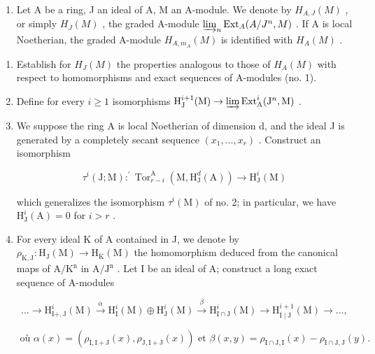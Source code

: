 
\begin{enumerate}
\def\labelenumi{\arabic{enumi})}
\tightlist
\item
  Let A be a ring, J an ideal of A, M an A-module. We denote by \(H_{A,J}(M)\) , or simply \(H_{J}(M)\) , the graded A-module \(\varinjlim_{n}\operatorname{Ext}_{A}(A/J^{n},M)\) . If A is local Noetherian, the graded A-module \(H_{A,m_{A}}(M)\) is identified with \(H_{A}(M)\) .
\end{enumerate}

\begin{enumerate}
\def\labelenumi{\alph{enumi})}
\item
  Establish for \(H_{J}(M)\) the properties analogous to those of \(H_{A}(M)\) with respect to homomorphisms and exact sequences of A-modules (no. 1).
\item
  Define for every \(i \geqslant 1\) isomorphisms \(\mathrm{H}_{\mathrm{J}}^{i+1}(\mathrm{M}) \to \varinjlim \operatorname{Ext}_{\mathrm{A}}^{i}(\mathrm{J}^{n}, \mathrm{M})\) .
\item
  We suppose the ring A is local Noetherian of dimension d, and the ideal J is generated by a completely secant sequence \((x_{1},\ldots,x_{r})\) . Construct an isomorphism

\[
\tau^ {i} (\mathrm{J}; \mathrm{M}): ^ {\prime} \operatorname{Tor} _ {r - i} ^ {\mathrm{A}} (\mathrm{M}, \mathrm{H} _ {\mathrm{J}} ^ {d} (\mathrm{A})) \longrightarrow \mathrm{H} _ {\mathrm{J}} ^ {i} (\mathrm{M})
\]

which generalizes the isomorphism \(\tau^{i}(\mathrm{M})\) of no. 2; in particular, we have \(\mathrm{H}_{\mathrm{J}}^{i}(\mathrm{A}) = 0\) for \(i > r\) .

\item
  For every ideal K of A contained in J, we denote by \(\rho_{\mathrm{K},\mathrm{J}}:\mathrm{H}_{\mathrm{J}}(\mathrm{M})\to \mathrm{H}_{\mathrm{K}}(\mathrm{M})\) the homomorphism deduced from the canonical maps of \(\mathrm{A / K^n}\) in \(\mathrm{A / J^n}\) . Let I be an ideal of A; construct a long exact sequence of A-modules

\[
\dots \longrightarrow \mathrm{H} _ {\mathrm{I} +, \mathrm{J}} ^ {i} (\mathrm{M}) \stackrel {\alpha} {\longrightarrow} \mathrm{H} _ {\mathrm{I}} ^ {i} (\mathrm{M}) \oplus \mathrm{H} _ {\mathrm{J}} ^ {i} (\mathrm{M}) \stackrel {\beta} {\longrightarrow} \mathrm{H} _ {\mathrm{I} \cap \mathrm{J}} ^ {i} (\mathrm{M}) \longrightarrow \mathrm{H} _ {\mathrm{I} \mid \mathrm{J}} ^ {i + 1} (\mathrm{M}) \longrightarrow \dots ,
\]

\[
\text {   où   } \alpha (x) = (\rho_ {\mathrm{I,I+J}} (x), \rho_ {\mathrm{J,I+J}} (x)) \text {   et   } \beta (x, y) = \rho_ {\mathrm{I} \cap \mathrm{J}, \mathrm{I}} (x) - \rho_ {\mathrm{I} \cap \mathrm{J}, \mathrm{J}} (y).
\]

\end{enumerate}

